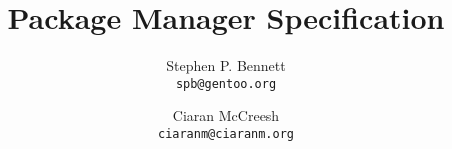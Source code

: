 \documentclass[a4paper,12pt]{report}
\title{Package Manager Specification}
\author{Stephen P. Bennett\\\texttt{spb@gentoo.org}
\and Ciaran McCreesh\\\texttt{ciaranm@ciaranm.org}}
\begin{document}
\maketitle

\tableofcontents
\listofalgorithms
\lstlistoflistings
























\end{document}
